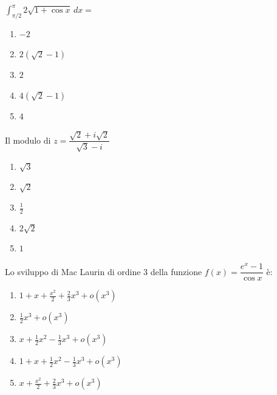 \begin{quiz}
$\displaystyle\int_{\pi/2}^{\pi}2\sqrt{1+\cos x}\,dx=$
\begin{enumerate}
\item $-2$
\item $2(\sqrt2-1)$
\item $2$
\item $4(\sqrt2-1)$
\item $4$
\end{enumerate}
\end{quiz}

\begin{quiz}
Il modulo di $z=\dfrac{\sqrt2+i\sqrt2}{\sqrt3-i}$
\begin{enumerate}
\item $\sqrt3$
\item $\sqrt2$
\item $\frac12$
\item $2\sqrt2$
\item $1$
\end{enumerate}
\end{quiz}

\begin{quiz}
Lo sviluppo di Mac Laurin di ordine $3$ della funzione $f(x)=\dfrac{e^x-1}{\cos x}$ \`e:
\begin{enumerate}
\item $1+x+\frac{x^2}{2}+\frac23x^3+o(x^3)$
\item $\frac12x^3+o(x^3)$
\item $x+\frac12x^2-\frac13x^3+o(x^3)$
\item $1+x+\frac12x^2-\frac13x^3+o(x^3)$
\item $x+\frac{x^2}{2}+\frac23x^3+o(x^3)$
\end{enumerate}
\end{quiz}

